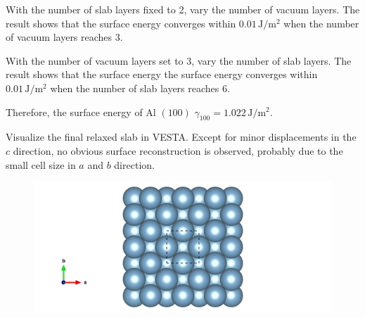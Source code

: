 \documentclass[12pt]{article}
\newcommand{\unit}[1]{\ensuremath{\, \mathrm{#1}}}
\begin{document}
With the number of slab layers fixed to 2, vary the number of vacuum layers. The result shows that the surface energy converges within $0.01\unit{J/m^2}$ when the number of vacuum layers reaches 3. 

\begin{figure}[h]
\begin{center}
	\quad
\end{center}
\end{figure}

With the number of vacuum layers set to 3, vary the number of slab layers. The result shows that the surface energy
the surface energy converges within $0.01\unit{J/m^2}$ when the number of slab layers reaches 6. 

Therefore, the surface energy of Al $(100)$ $\gamma_{100} = 1.022\unit{J/m^2}$. 

Visualize the final relaxed slab in VESTA. Except for minor displacements in the $c$ direction, no obvious surface reconstruction is observed, probably due to the small cell size in $a$ and $b$ direction. 

\begin{figure}[h]
\begin{center}
	\includegraphics[width=.8\textwidth]{100.png}
\end{center}
\end{figure}
\end{document}
